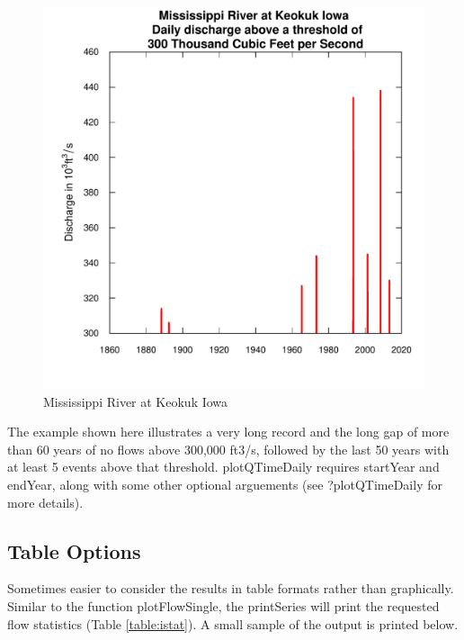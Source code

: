 \documentclass[a4paper,11pt]{article}\usepackage{graphicx, color}
\newenvironment{knitrout}{}{} %
\begin{document}
\begin{knitrout}
\begin{figure}[]
\includegraphics[width=1\linewidth,height=1\linewidth]{figure/Mississippi} \caption[Mississippi River at Keokuk Iowa]{Mississippi River at Keokuk Iowa\label{fig:Mississippi}}
\end{figure}


\end{knitrout}


The example shown here illustrates a very long record and the long gap of more than 60 years of no flows above 300,000 ft3/s, followed by the last 50 years with at least 5 events above that threshold. plotQTimeDaily requires startYear and endYear, along with some other optional arguements (see ?plotQTimeDaily for more details).

\FloatBarrier

\subsection{Table Options}
\label{sec:tableOptions}
Sometimes easier to consider the results in table formats rather than graphically. Similar to the function plotFlowSingle, the printSeries will print the requested flow statistics (Table \ref{table:istat}). A small sample of the output is printed below.
\end{document}
